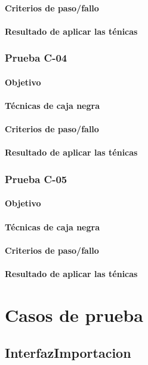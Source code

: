 \documentclass[10pt,a4paper]{article}
\begin{document}
			\paragraph{Criterios de paso/fallo}
			\paragraph{Resultado de aplicar las ténicas}
			\subsubsection{Prueba C-04}
			\paragraph{Objetivo}
			\paragraph{Técnicas de caja negra}
			\paragraph{Criterios de paso/fallo}
			\paragraph{Resultado de aplicar las ténicas}
			\subsubsection{Prueba C-05}
			\paragraph{Objetivo}
			\paragraph{Técnicas de caja negra}
			\paragraph{Criterios de paso/fallo}
			\paragraph{Resultado de aplicar las ténicas}
\section{Casos de prueba}
	\subsection{InterfazImportacion}
\end{document}
